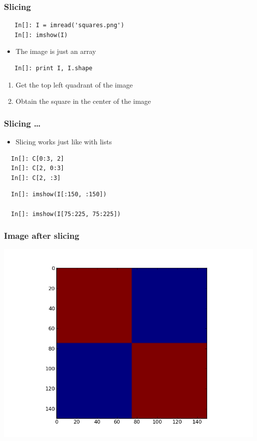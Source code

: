\begin{frame}[fragile]
  \frametitle{Slicing}
  \begin{lstlisting}
   In[]: I = imread('squares.png')
   In[]: imshow(I)
  \end{lstlisting}
  \begin{itemize}
  \item The image is just an array
  \end{itemize}
  \begin{lstlisting}
   In[]: print I, I.shape
  \end{lstlisting}
  \begin{enumerate}
  \item Get the top left quadrant of the image
  \item Obtain the square in the center of the image
  \end{enumerate}
\end{frame}

\begin{frame}[fragile]
  \frametitle{Slicing \ldots}
  \begin{itemize}
  \item Slicing works just like with lists
  \end{itemize}
  \begin{lstlisting}
  In[]: C[0:3, 2]
  In[]: C[2, 0:3]
  In[]: C[2, :3]
  \end{lstlisting}
  \begin{lstlisting}
  In[]: imshow(I[:150, :150])

  In[]: imshow(I[75:225, 75:225])
  \end{lstlisting}
\end{frame}

\begin{frame}
\frametitle{Image after slicing}
\includegraphics[scale=0.45]{../advanced_python/images/slice.png}\\
\end{frame}



